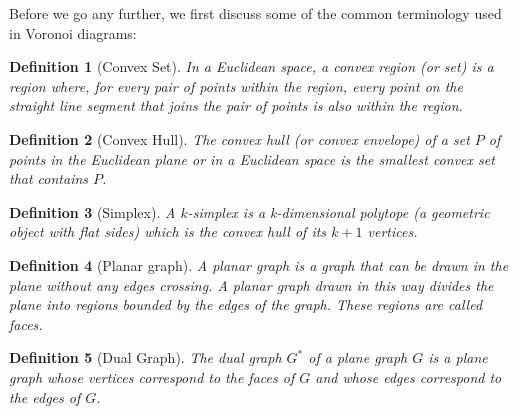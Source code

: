 \documentclass[10pt,a4paper]{article}
\newtheorem{defn}{Definition}
\begin{document}
      Before we go any further, we first discuss some of the common terminology used in Voronoi diagrams:
      \\
      \begin{defn}[Convex Set]
      	In a Euclidean space, a convex region (or set) is a region where, for every pair of points within the region, every point on the straight line segment that joins the pair of points is also within the region.
      \end{defn}
 
      \begin{defn}[Convex Hull]
      	The convex hull (or convex envelope) of a set $P$ of points in the Euclidean plane or in a Euclidean space is the smallest convex set that contains $P$.
      \end{defn}
       \begin{defn}[Simplex]
       	A $k$-simplex is a k-dimensional polytope (a geometric object with flat sides) which is the convex hull of its $k+1$ vertices.
       \end{defn}
       \begin{defn}[Planar graph]
       	A planar graph is a graph that can be drawn in the plane without any edges crossing. A planar graph drawn in this way divides the plane into regions bounded by the edges of the graph. These regions are called faces. 
       \end{defn} 
       \begin{defn}[Dual Graph]
       	The dual graph $G^*$ of a plane graph $G$ is a plane graph whose vertices correspond to the faces of $G$ and whose edges correspond to the edges of $G$.
       \end{defn}
      
\end{document}
